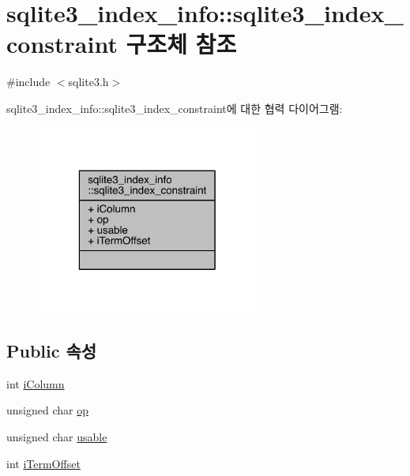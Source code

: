 \hypertarget{structsqlite3__index__info_1_1sqlite3__index__constraint}{}\section{sqlite3\+\_\+index\+\_\+info\+:\+:sqlite3\+\_\+index\+\_\+constraint 구조체 참조}
\label{structsqlite3__index__info_1_1sqlite3__index__constraint}


{\ttfamily \#include $<$sqlite3.\+h$>$}



sqlite3\+\_\+index\+\_\+info\+:\+:sqlite3\+\_\+index\+\_\+constraint에 대한 협력 다이어그램\+:
\nopagebreak
\begin{figure}[H]
\begin{center}
\leavevmode
\includegraphics[width=208pt]{structsqlite3__index__info_1_1sqlite3__index__constraint__coll__graph}
\end{center}
\end{figure}
\subsection*{Public 속성}
\begin{DoxyCompactItemize}
\item 
int \hyperlink{structsqlite3__index__info_1_1sqlite3__index__constraint_a0f1e207060420058ee2881f2ea368e3a}{i\+Column}
\item 
unsigned char \hyperlink{structsqlite3__index__info_1_1sqlite3__index__constraint_a362f4ec1f71975cb0ac39a8b5e4b1476}{op}
\item 
unsigned char \hyperlink{structsqlite3__index__info_1_1sqlite3__index__constraint_ae16e62caeab743cc68bb22227dacb501}{usable}
\item 
int \hyperlink{structsqlite3__index__info_1_1sqlite3__index__constraint_a4e8368da66f34b7f07b369984b813d1b}{i\+Term\+Offset}
\end{DoxyCompactItemize}


